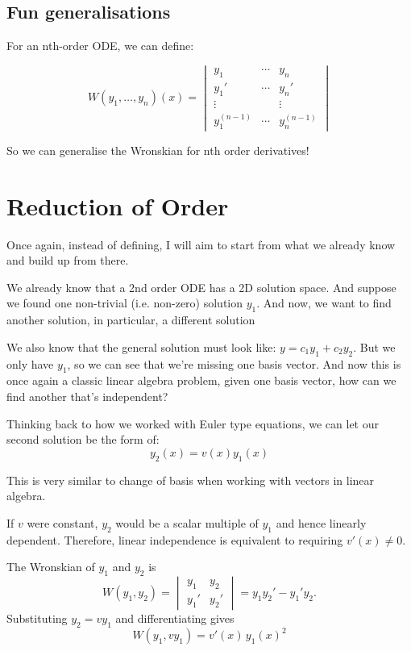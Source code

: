 \subsection{Fun generalisations}

For an nth-order ODE, we can define: 

$$W(y_1,\dots,y_n)(x) =
\begin{vmatrix}
y_1 & \cdots & y_n \\
y_1' & \cdots & y_n' \\
\vdots & & \vdots \\
y_1^{(n-1)} & \cdots & y_n^{(n-1)}
\end{vmatrix}$$

So we can generalise the Wronskian for nth order derivatives! 

\section{Reduction of Order}

Once again, instead of defining, I will aim to start from what we already know and build up from there. 

We already know that a 2nd order ODE has a 2D solution space. And suppose we found one non-trivial (i.e. non-zero) solution $y_1$. And now, we want to find another solution, in particular, a different solution 

We also know that the general solution must look like: $y = c_1 y_1 + c_2 y_2$. But we only have $y_1$, so we can see that we're missing one basis vector. And now this is once again a classic linear algebra problem, given one basis vector, how can we find another that's independent? 

Thinking back to how we worked with Euler type equations, we can let our second solution be the form of: 
$$
y_2(x) = v(x) y_1(x)
$$

This is very similar to change of basis when working with vectors in linear algebra. 

If $v$ were constant, $y_2$ would be a scalar multiple of $y_1$ and hence linearly dependent. Therefore, linear independence is equivalent to requiring $v'(x) \neq 0$.


The Wronskian of $y_1$ and $y_2$ is
$$
W(y_1,y_2) =
\begin{vmatrix}
y_1 & y_2 \\
y_1' & y_2'
\end{vmatrix}
= y_1 y_2' - y_1' y_2.
$$
Substituting $y_2 = v y_1$ and differentiating gives
$$
W(y_1, v y_1) = v'(x)\,y_1(x)^2
$$

